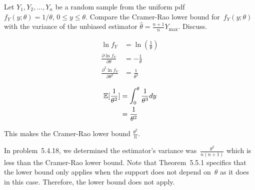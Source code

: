 \begin{problem}
   Let ${Y_1,Y_2,\ldots,Y_n}$ be a random sample from the uniform pdf ${f_Y(y;\theta) = 1 / \theta \text{, } 0 \leq y \leq \theta}$. Compare the Cramer-Rao lower bound for~${f_Y(y;\theta)}$ with the variance of the unbiased estimator ${\hat{\theta} = \frac{n+1}{n} Y_{\max}}$. Discuss.
\end{problem}

\begin{align}
  \ln f_Y &= \ln \left(\frac{1}{\theta}\right) \\
  \frac{\partial \ln f_Y}{\partial \theta} &= -\frac{1}{\theta} \\
  \frac{\partial^2 \ln f_Y}{\partial \theta^2} &= \frac{1}{\theta^2}
\end{align}

\begin{align}
  \mathbb{E}\lbrack\frac{1}{\theta^2}\rbrack &= \int_{0}^{\theta}\frac{1}{\theta^3}dy \\
                              &= \frac{1}{\theta^2}
\end{align}

This makes the Cramer-Rao lower bound $\boxed{\frac{\theta^2}{n}}$.

In problem~5.4.18, we determined the estimator's variance was~$\frac{\theta^2}{n(n+1)}$ which is less than the Cramer-Rao lower bound.  Note that Theorem~5.5.1 specifics that the lower bound only applies when the support does not depend on~$\theta$ as it does in this case.  Therefore, the lower bound does not apply.
